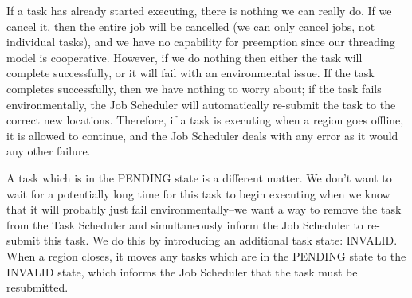 If a task has already started executing, there is nothing we can really do. If we cancel it, then the entire job will be cancelled (we can only cancel jobs, not individual tasks), and we have no capability for preemption since our threading model is cooperative. However, if we do nothing then either the task will complete successfully, or it will fail with an environmental issue. If the task completes successfully, then we have nothing to worry about; if the task fails environmentally, the Job Scheduler will automatically re-submit the task to the correct new locations. Therefore, if a task is executing when a region goes offline, it is allowed to continue, and the Job Scheduler deals with any error as it would any other failure.

A task which is in the PENDING state is a different matter. We don't want to wait for a potentially long time for this task to begin executing when we know that it will probably just fail environmentally--we want a way to remove the task from the Task Scheduler and simultaneously inform the Job Scheduler to re-submit this task. We do this by introducing an additional task state: INVALID. When a region closes, it moves any tasks which are in the PENDING state to the INVALID state, which informs the Job Scheduler that the task must be resubmitted. 

